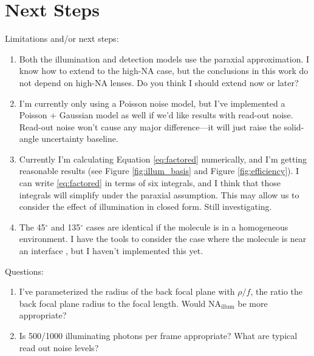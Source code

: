 \documentclass[11pt]{article}
\begin{document}
\section{Next Steps}
Limitations and/or next steps:
\begin{enumerate}
\item Both the illumination and detection models use the paraxial approximation. I know how to extend to the high-NA case, but the conclusions in this work do not depend
  on high-NA lenses. Do you think I should extend now or later?
\item I'm currently only using a Poisson noise model, but I've implemented a
  Poisson + Gaussian model as well if we'd like results with read-out noise. Read-out
  noise won't cause any major difference---it will just raise the solid-angle
  uncertainty baseline.
\item Currently I'm calculating Equation \ref{eq:factored} numerically, and I'm
  getting reasonable results (see Figure \ref{fig:illum_basis} and Figure
  \ref{fig:efficiency}). I can write \ref{eq:factored} in terms of six
  integrals, and I think that those integrals will simplify under the paraxial
  assumption. This may allow us to consider the effect of illumination in closed
  form. Still investigating.
\item The 45${}^{\circ}$ and 135${}^{\circ}$ cases are identical if the molecule
  is in a homogeneous environment. I have the tools to consider the case where
  the molecule is near an interface \cite{backer}, but I haven't implemented
  this yet.
\end{enumerate}

Questions:
\begin{enumerate}
\item I've parameterized the radius of the back focal plane with $\rho/f$, the
  ratio the back focal plane radius to the focal length. Would NA${}_{\text{illum}}$
  be more appropriate?
\item Is 500/1000 illuminating photons per frame appropriate? What are typical
  read out noise levels?
\end{enumerate}

{}

\end{document}
